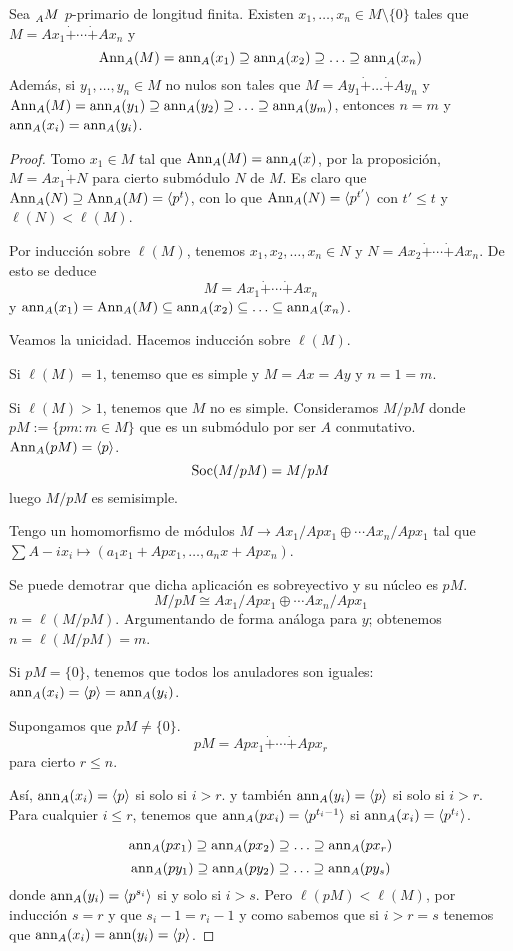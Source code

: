\begin{teo}
  Sea \(\prescript{}{A}{M}\) \(p\)-primario de longitud finita. Existen
  \(x_1,\ldots, x_n\in M\setminus\{0\}\) tales
  que \(M=Ax_1\dot{+}\cdots\dot{+} Ax_n\) y
  \[
    \operatorname{Ann}_A(M)=\operatorname{ann}_A(x_1)\supseteq\operatorname{ann}_A(x_2)\supseteq\ldots
    \supseteq\operatorname{ann}_A(x_n)
  \]
  Además, si \(y_1,\ldots, y_n\in M\) no nulos son tales que
  \(
    M=Ay_1\dot{+}\ldots\dot{+} Ay_n
  \)
  y
  \(
    \operatorname{Ann}_A(M)=\operatorname{ann}_A(y_1)\supseteq\operatorname{ann}_A(y_2)\supseteq\ldots
    \supseteq\operatorname{ann}_A(y_m)
  \), entonces \(n=m\) y \(\operatorname{ann}_A(x_i)=\operatorname{ann}_A(y_i)\).
\end{teo}
\begin{proof}
  Tomo \(x_1\in M\) tal que \(\operatorname{Ann}_A(M)=\operatorname{ann}_A(x)\), por la proposición,
  \(M=Ax_1\dot{+} N\) para cierto submódulo \(N\) de \(M\).
  Es claro que \(\operatorname{Ann}_A(N)\supseteq\operatorname{Ann}_A(M)=\langle p^t\rangle\),
  con lo que \(\operatorname{Ann}_A(N)=\langle p^{t'}\rangle\) con \(t'\le t\) y
  \(\ell(N)<\ell(M)\).

  Por inducción sobre \(\ell(M)\), tenemos \(x_1,x_2,\ldots, x_n\in N\)
  y \(N=Ax_2\dot{+}\cdots\dot{+} Ax_n\).
  De esto se deduce
  \[
    M=Ax_1\dot{+}\cdots\dot{+} Ax_n
  \]
  y \(\operatorname{ann}_A(x_1)=\operatorname{Ann}_A(M)\subseteq\operatorname{ann}_A(x_2)\subseteq\ldots\subseteq
  \operatorname{ann}_A(x_n)\).

  Veamos la unicidad. Hacemos inducción sobre \(\ell(M)\).

  Si \(\ell(M)=1\), tenemso que es simple y \(M=Ax=Ay\) y \(n=1=m\).

  Si \(\ell(M)>1\), tenemos que \(M\) no es simple. Consideramos
  \(M/pM\) donde \(pM:=\{pm:m\in M\}\) que es un submódulo por ser
  \(A\) conmutativo. \(\operatorname{Ann}_A(pM)=\langle p\rangle\).
  \[
    \operatorname{Soc}(M/pM)=M/pM
  \]
  luego \(M/pM\) es semisimple.

  Tengo un homomorfismo de módulos \(M\longrightarrow
  Ax_1/Apx_1\oplus\cdots
  Ax_n/Apx_1
  \) tal que \(\sum A-ix_i\mapsto (a_1 x_1+Apx_1,\ldots,
  a_n x+Apx_n)\).

  Se puede demotrar que dicha aplicación es sobreyectivo y su núcleo es
  \(pM\).
  \[
    M/pM\cong
    Ax_1/Apx_1\oplus\cdots
    Ax_n/Apx_1
  \]
  \(n = \ell(M/pM)\). Argumentando de forma análoga para \(y\);
  obtenemos \(n= \ell(M/pM)=m\).

  Si \(pM=\{0\}\), tenemos que todos los anuladores son iguales:
  \(\operatorname{ann}_A(x_i)=\langle p\rangle=\operatorname{ann}_A(y_i)\).

  Supongamos que \(pM\neq\{0\}\).
  \[
    pM=Apx_1\dot{+}\cdots\dot{+} Apx_r
  \]
  para cierto \(r\le n\).

  Así, \(\operatorname{ann}_A(x_i)=\langle p\rangle\) si solo si \(i>r\).
  y también \(\operatorname{ann}_A(y_i)=\langle p\rangle\) si solo si \(i>r\).
  Para cualquier \(i\le r\), tenemos que \(\operatorname{ann}_A(px_i)=\langle
  p^{t_i-1}\rangle\) si \(\operatorname{ann}_A(x_i)=\langle p^{t_i}\rangle\).

  \[
   \operatorname{ann}_A(px_1)\supseteq\operatorname{ann}_A(px_2)\supseteq\ldots
    \supseteq\operatorname{ann}_A(px_r)
  \]
  \[
   \operatorname{ann}_A(py_1)\supseteq\operatorname{ann}_A(py_2)\supseteq\ldots
    \supseteq\operatorname{ann}_A(py_s)
  \]
  donde \(\operatorname{ann}_A(y_i)=\langle p^{s_i}\rangle\) si y solo si \(i>s\).
  Pero \(\ell(pM)<\ell(M)\), por inducción \(s=r\) y que \(s_i-1=
  r_i-1\) y como sabemos que si \(i>r=s\) tenemos que
  \(\operatorname{ann}_A(x_i)=\operatorname{ann}(y_i)=\langle p\rangle\).
\end{proof}
